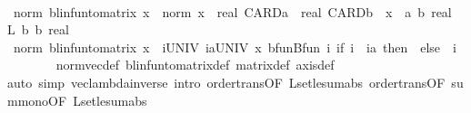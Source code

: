 \begin{isabellebody}
\ \ \isamarkupfalse%
\ {\isachardoublequoteopen}norm\ {\isacharparenleft}{\kern0pt}blinfun{\isacharunderscore}{\kern0pt}to{\isacharunderscore}{\kern0pt}matrix\ x{\isacharparenright}{\kern0pt}\ {\isasymle}\ norm\ x\ {\isacharasterisk}{\kern0pt}\ {\isacharparenleft}{\kern0pt}real\ CARD{\isacharparenleft}{\kern0pt}{\isacharprime}{\kern0pt}a{\isacharparenright}{\kern0pt}\ {\isacharasterisk}{\kern0pt}\ real\ CARD{\isacharparenleft}{\kern0pt}{\isacharprime}{\kern0pt}b{\isacharparenright}{\kern0pt}{\isacharparenright}{\kern0pt}{\isachardoublequoteclose}\ \ x\ {\isacharcolon}{\kern0pt}{\isacharcolon}{\kern0pt}\ {\isachardoublequoteopen}{\isacharparenleft}{\kern0pt}{\isacharprime}{\kern0pt}a\ {\isasymRightarrow}\isactrlsub b\ real{\isacharparenright}{\kern0pt}\ {\isasymRightarrow}\isactrlsub L\ {\isacharprime}{\kern0pt}b\ {\isasymRightarrow}\isactrlsub b\ real{\isachardoublequoteclose}\isanewline
\ \ \isamarkupfalse%
\ {\isacharminus}{\kern0pt}\isanewline
\ \ \ \ \isamarkupfalse%
\ {\isachardoublequoteopen}norm\ {\isacharparenleft}{\kern0pt}blinfun{\isacharunderscore}{\kern0pt}to{\isacharunderscore}{\kern0pt}matrix\ x{\isacharparenright}{\kern0pt}\ {\isasymle}\ {\isacharparenleft}{\kern0pt}{\isasymSum}i{\isasymin}UNIV{\isachardot}{\kern0pt}\ {\isasymSum}ia{\isasymin}UNIV{\isachardot}{\kern0pt}\ {\isasymbar}{\isacharparenleft}{\kern0pt}x\ {\isacharparenleft}{\kern0pt}bfun{\isachardot}{\kern0pt}Bfun\ {\isacharparenleft}{\kern0pt}{\isasymlambda}i{\isachardot}{\kern0pt}\ if\ i\ {\isacharequal}{\kern0pt}\ ia\ then\ {}\ else\ {}{\isacharparenright}{\kern0pt}{\isacharparenright}{\kern0pt}{\isacharparenright}{\kern0pt}\ i{\isasymbar}{\isacharparenright}{\kern0pt}{\isachardoublequoteclose}\isanewline
\ \ \ \ \ \ \isamarkupfalse%
\ norm{\isacharunderscore}{\kern0pt}vec{\isacharunderscore}{\kern0pt}def\ blinfun{\isacharunderscore}{\kern0pt}to{\isacharunderscore}{\kern0pt}matrix{\isacharunderscore}{\kern0pt}def\ matrix{\isacharunderscore}{\kern0pt}def\ axis{\isacharunderscore}{\kern0pt}def\isanewline
\ \ \ \ \ \ \isamarkupfalse%
{\isacharparenleft}{\kern0pt}auto\ simp{\isacharcolon}{\kern0pt}\ vec{\isacharunderscore}{\kern0pt}lambda{\isacharunderscore}{\kern0pt}inverse\ intro{\isacharbang}{\kern0pt}{\isacharcolon}{\kern0pt}\ order{\isachardot}{\kern0pt}trans{\isacharbrackleft}{\kern0pt}OF\ L{}{\isacharunderscore}{\kern0pt}set{\isacharunderscore}{\kern0pt}le{\isacharunderscore}{\kern0pt}sum{\isacharunderscore}{\kern0pt}abs{\isacharbrackright}{\kern0pt}\ order{\isachardot}{\kern0pt}trans{\isacharbrackleft}{\kern0pt}OF\ sum{\isacharunderscore}{\kern0pt}mono{\isacharbrackleft}{\kern0pt}OF\ L{}{\isacharunderscore}{\kern0pt}set{\isacharunderscore}{\kern0pt}le{\isacharunderscore}{\kern0pt}sum{\isacharunderscore}{\kern0pt}abs{\isacharbrackright}{\kern0pt}{\isacharbrackright}{\kern0pt}{\isacharparenright}{\kern0pt}\isanewline

\end{isabellebody}
